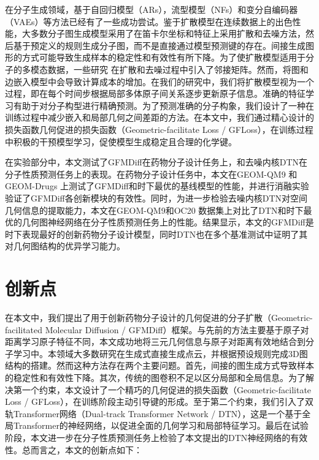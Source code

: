 在分子生成领域，基于自回归模型（ARs）\cite{gschnet_wallach_19,gshperenet_luo_22}，流型模型（NFs）\cite{moflow_zang_20,graphaf_shi_20}和变分自编码器（VAEs）\cite{jtvae_jin_18,cgvae_liu_18}等方法已经有了一些成功尝试。鉴于扩散模型在连续数据上的出色性能，大多数分子图生成模型采用了在笛卡尔坐标和特征上采用扩散和去噪方法，然后基于预定义的规则生成分子图，而不是直接通过模型预测键的存在。间接生成图形的方式可能导致生成样本的稳定性和有效性有所下降。为了使扩散模型适用于分子的多模态数据，一些研究 \cite{edpgnn_niu_20,digress_vignac_22,midi_vignac_23}在扩散和去噪过程中引入了邻接矩阵。然而，将图和边嵌入模型中会导致计算成本的增加。在我们的研究中，我们将扩散模型视为一个过程，即在每个时间步根据局部多体原子间关系逐步更新原子信息。准确的特征学习有助于对分子构型进行精确预测。为了预测准确的分子构象，我们设计了一种在训练过程中减少嵌入和局部几何之间差距的方法。在本文中，我们通过精心设计的损失函数几何促进的损失函数（Geometric-facilitate Loss / GFLoss），在训练过程中积极的干预模型学习，促使模型生成稳定且合理的化学键。

在实验部分中，本文测试了GFMDiff在药物分子设计任务上，和去噪内核DTN在分子性质预测任务上的表现。在药物分子设计任务中，本文在GEOM-QM9 \cite{qm9_ramakrishnan_14}和GEOM-Drugs \cite{drugs_axelrod_22}上测试了GFMDiff和时下最优的基线模型的性能，并进行消融实验验证了GFMDiff各创新模块的有效性。同时，为进一步检验去噪内核DTN对空间几何信息的提取能力，本文在GEOM-QM9和OC20 \cite{oc20_chanussot_21}数据集上对比了DTN和时下最优的几何图神经网络在分子性质预测任务上的性能。结果显示，本文的GFMDiff是时下表现最好的创新药物分子设计模型，同时DTN也在多个基准测试中证明了其对几何图结构的优异学习能力。

\section{创新点}
在本文中，我们提出了用于创新药物分子设计的几何促进的分子扩散（Geometric-facilitated Molecular Diffusion / GFMDiff）框架。与先前的方法主要基于原子对距离学习原子特征不同，本文成功地将三元几何信息与原子对距离有效地结合到分子学习中。本领域大多数研究在生成式直接生成点云，并根据预设规则完成3D图结构的搭建。然而这种方法存在两个主要问题。首先，间接的图生成方式导致样本的稳定性和有效性下降。其次，传统的图卷积不足以区分局部和全局信息。为了解决第一个约束，本文设计了一个精巧的几何促进的损失函数（Geometric-facilitate Loss / GFLoss），在训练阶段主动引导键的形成。至于第二个约束，我们引入了双轨Transformer网络（Dual-track Transformer Network / DTN），这是一个基于全局Transformer的神经网络，以促进全面的几何学习和局部特征学习。最后在试验阶段，本文进一步在分子性质预测任务上检验了本文提出的DTN神经网络的有效性。总而言之，本文的创新点如下：

